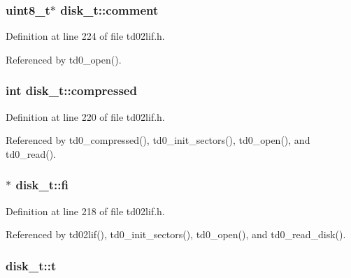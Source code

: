 \subsubsection[{\texorpdfstring{comment}{comment}}]{\setlength{\rightskip}{0pt plus 5cm}uint8\+\_\+t$\ast$ disk\+\_\+t\+::comment}\hypertarget{structdisk__t_abd7a6652f29f0059638dab7a88558783}{}\label{structdisk__t_abd7a6652f29f0059638dab7a88558783}


Definition at line 224 of file td02lif.\+h.



Referenced by td0\+\_\+open().

\subsubsection[{\texorpdfstring{compressed}{compressed}}]{\setlength{\rightskip}{0pt plus 5cm}int disk\+\_\+t\+::compressed}\hypertarget{structdisk__t_abe333f1a8b322fbed0d1c1178939016e}{}\label{structdisk__t_abe333f1a8b322fbed0d1c1178939016e}


Definition at line 220 of file td02lif.\+h.



Referenced by td0\+\_\+compressed(), td0\+\_\+init\+\_\+sectors(), td0\+\_\+open(), and td0\+\_\+read().

\subsubsection[{\texorpdfstring{fi}{fi}}]{$\ast$ disk\+\_\+t\+::fi}\hypertarget{structdisk__t_a1832d0f8cdda8f731de9e1daea2900a5}{}\label{structdisk__t_a1832d0f8cdda8f731de9e1daea2900a5}


Definition at line 218 of file td02lif.\+h.



Referenced by td02lif(), td0\+\_\+init\+\_\+sectors(), td0\+\_\+open(), and td0\+\_\+read\+\_\+disk().

\subsubsection[{\texorpdfstring{t}{t}}]{ disk\+\_\+t\+::t}\hypertarget{structdisk__t_a6cb7e0306f35b8b97bf3ef18e2f45455}{}\label{structdisk__t_a6cb7e0306f35b8b97bf3ef18e2f45455}


